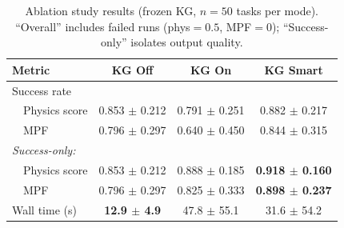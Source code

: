 \begin{table}[htbp]
\centering
\caption{Ablation study results (frozen KG, $n=50$ tasks per mode). ``Overall'' includes failed runs (phys${}=0.5$, MPF${}=0$); ``Success-only'' isolates output quality.}
\label{tab:ablation-v2}
\small
\setlength{\tabcolsep}{4pt}
\begin{tabular}{lccc}
\toprule
Metric & \textbf{KG Off} & \textbf{KG On} & \textbf{KG Smart} \\
\midrule
Success rate & \textbf{100%
\multicolumn{4}{l}{\textit{Overall (all tasks):}} \\
~~Physics score & 0.853 $\pm$ 0.212 & 0.791 $\pm$ 0.251 & 0.882 $\pm$ 0.217 \\
~~MPF & 0.796 $\pm$ 0.297 & 0.640 $\pm$ 0.450 & 0.844 $\pm$ 0.315 \\[2pt]
\multicolumn{4}{l}{\textit{Success-only:}} \\
~~Physics score & 0.853 $\pm$ 0.212 & 0.888 $\pm$ 0.185 & \textbf{0.918 $\pm$ 0.160} \\
~~MPF & 0.796 $\pm$ 0.297 & 0.825 $\pm$ 0.333 & \textbf{0.898 $\pm$ 0.237} \\[2pt]
Wall time (s) & \textbf{12.9 $\pm$ 4.9} & 47.8 $\pm$ 55.1 & 31.6 $\pm$ 54.2 \\
\bottomrule
\end{tabular}
\end{table}